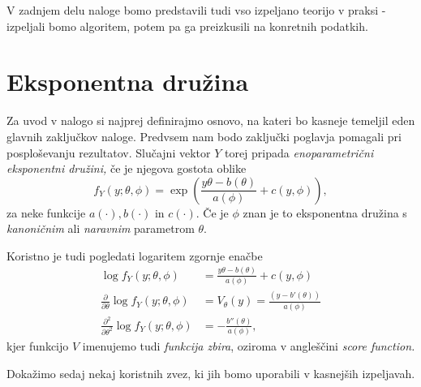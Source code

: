 \documentclass[12pt,a4paper]{amsart}
\theoremstyle{definition} %
\theoremstyle{plain} %
\begin{document}
V zadnjem delu naloge bomo predstavili tudi vso izpeljano teorijo v praksi - izpeljali bomo algoritem, potem pa ga preizkusili na konretnih podatkih.
\section{Eksponentna družina} 
Za uvod v nalogo si najprej definirajmo osnovo, na kateri bo kasneje temeljil eden glavnih zaključkov naloge. Predvsem nam bodo zaključki poglavja pomagali
pri posploševanju rezultatov. Slučajni vektor $Y$ torej pripada \textit{enoparametrični eksponentni družini,} če je njegova gostota oblike 
\begin{equation}
    f_{Y}(y; \theta, \phi) = \exp{\left(\frac{y\theta - b(\theta)}{a(\phi)} + c(y, \phi)\right)},
\end{equation}
za neke funkcije $a(\cdot), b(\cdot)\text{~in~}c(\cdot).$ Če je $\phi$ znan je to eksponentna družina s \textit{kanoničnim} ali \textit{naravnim} parametrom $\theta.$

Koristno je tudi pogledati logaritem zgornje enačbe
\begin{align}
    \log f_{Y}(y; \theta, \phi) &= \frac{y\theta - b(\theta)}{a(\phi)} + c(y,\phi) \\
    \frac{\partial}{\partial \theta} \log f_{Y}(y;\theta, \phi) &= V_{\theta}(y) = \frac{(y - b'(\theta))}{a(\phi)} \\
    \frac{\partial^2}{\partial \theta^2}\log f_{Y}(y; \theta, \phi) &= -\frac{b''(\theta)}{a(\phi)},
\end{align}
kjer funkcijo $V$ imenujemo tudi \textit{funkcija zbira}, oziroma v angleščini \textit{score function.}


Dokažimo sedaj nekaj koristnih zvez, ki jih bomo uporabili v kasnejših izpeljavah.
\end{document}
